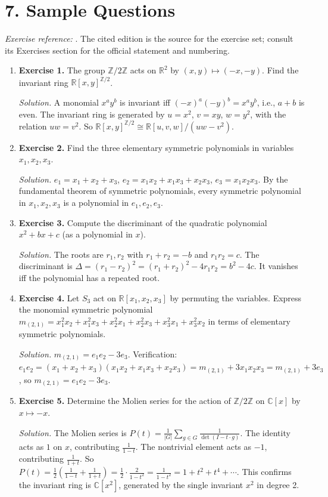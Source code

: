\section*{7. Sample Questions}
\emph{Exercise reference:} \cite{invariant_theory_ref1}. The cited edition is the source for the exercise set; consult its Exercises section for the official statement and numbering.
\begin{enumerate}[leftmargin=*,itemsep=0.9em]
\item \textbf{Exercise 1.} The group $\mathbb{Z}/2\mathbb{Z}$ acts on $\mathbb{R}^2$ by $(x,y)\mapsto(-x,-y)$. Find the invariant ring $\mathbb{R}[x,y]^{\mathbb{Z}/2}$.

\emph{Solution.} A monomial $x^a y^b$ is invariant iff $(-x)^a(-y)^b=x^a y^b$, i.e., $a+b$ is even. The invariant ring is generated by $u=x^2$, $v=xy$, $w=y^2$, with the relation $uw=v^2$. So $\mathbb{R}[x,y]^{\mathbb{Z}/2}\cong\mathbb{R}[u,v,w]/(uw-v^2)$.

\item \textbf{Exercise 2.} Find the three elementary symmetric polynomials in variables $x_1,x_2,x_3$.

\emph{Solution.} $e_1=x_1+x_2+x_3$, $e_2=x_1 x_2+x_1 x_3+x_2 x_3$, $e_3=x_1 x_2 x_3$. By the fundamental theorem of symmetric polynomials, every symmetric polynomial in $x_1,x_2,x_3$ is a polynomial in $e_1,e_2,e_3$.

\item \textbf{Exercise 3.} Compute the discriminant of the quadratic polynomial $x^2+bx+c$ (as a polynomial in $x$).

\emph{Solution.} The roots are $r_1,r_2$ with $r_1+r_2=-b$ and $r_1 r_2=c$. The discriminant is $\Delta=(r_1-r_2)^2=(r_1+r_2)^2-4r_1 r_2=b^2-4c$. It vanishes iff the polynomial has a repeated root.

\item \textbf{Exercise 4.} Let $S_3$ act on $\mathbb{R}[x_1,x_2,x_3]$ by permuting the variables. Express the monomial symmetric polynomial $m_{(2,1)}=x_1^2 x_2+x_1^2 x_3+x_2^2 x_1+x_2^2 x_3+x_3^2 x_1+x_3^2 x_2$ in terms of elementary symmetric polynomials.

\emph{Solution.} $m_{(2,1)}=e_1 e_2-3e_3$. Verification: $e_1 e_2=(x_1+x_2+x_3)(x_1 x_2+x_1 x_3+x_2 x_3)=m_{(2,1)}+3x_1 x_2 x_3=m_{(2,1)}+3e_3$, so $m_{(2,1)}=e_1 e_2-3e_3$.

\item \textbf{Exercise 5.} Determine the Molien series for the action of $\mathbb{Z}/2\mathbb{Z}$ on $\mathbb{C}[x]$ by $x\mapsto -x$.

\emph{Solution.} The Molien series is $P(t)=\frac{1}{|G|}\sum_{g\in G}\frac{1}{\det(I-t\cdot g)}$. The identity acts as $1$ on $x$, contributing $\frac{1}{1-t}$. The nontrivial element acts as $-1$, contributing $\frac{1}{1+t}$. So $P(t)=\frac{1}{2}\left(\frac{1}{1-t}+\frac{1}{1+t}\right)=\frac{1}{2}\cdot\frac{2}{1-t^2}=\frac{1}{1-t^2}=1+t^2+t^4+\cdots$. This confirms the invariant ring is $\mathbb{C}[x^2]$, generated by the single invariant $x^2$ in degree 2.

\end{enumerate}
